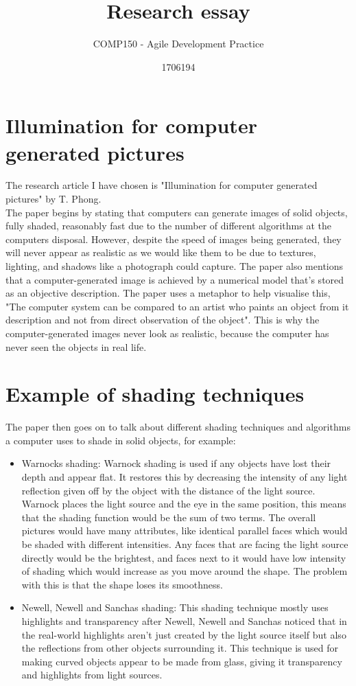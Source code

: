 \documentclass{scrartcl}
\title{Research essay}
\subtitle{COMP150 - Agile Development Practice}
\author{1706194}
\begin{document}
	
	\maketitle
	

	
	\section{Illumination for computer generated pictures}	
The research article I have chosen is "Illumination for computer generated pictures" by T. Phong.\\ 
The paper begins by stating that computers can generate images of solid objects, fully shaded, reasonably fast due to the number of different algorithms at the computers disposal. However, despite the speed of images being generated, they will never appear as realistic as we would like them to be due to textures, lighting, and shadows like a photograph could capture. The paper also mentions that a computer-generated image is achieved by a numerical model that’s stored as an objective description. The paper uses a metaphor to help visualise this, "The computer system can be compared to an artist who paints an object from it description and not from direct observation of the object". This is why the computer-generated images never look as realistic, because the computer has never seen the objects in real life. 
	
	\section{Example of shading techniques}
	
	The paper then goes on to talk about different shading techniques and algorithms a computer uses to shade in solid objects, for example: 
	\begin{itemize}
	\item Warnocks shading: Warnock shading is used if any objects have lost their depth and appear flat. It restores this by decreasing the intensity of any light reflection given off by the object with the distance of the light source.\\  
	Warnock places the light source and the eye in the same position, this means that the shading function would be the sum of two terms. The overall pictures would have many attributes, like identical parallel faces which would be shaded with different intensities. Any faces that are facing the light source directly would be the brightest, and faces next to it would have low intensity of shading which would increase as you move around the shape. 
	The problem with this is that the shape loses its smoothness.\\  
	\item Newell, Newell and Sanchas shading: This shading technique mostly uses highlights and transparency after Newell, Newell and Sanchas noticed that in the real-world highlights aren't just created by the light source itself but also the reflections from other objects surrounding it. This technique is used for making curved objects appear to be made from glass, giving it transparency and highlights from light sources.
\end{itemize} 
	
\end{document}
